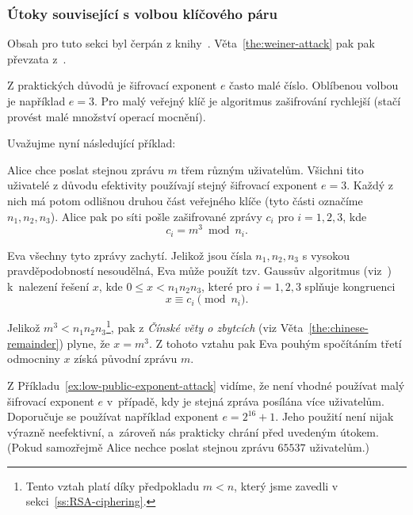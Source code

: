 \documentclass[
  program=infoi,
  biblatex=false,
  figures=true,
  glossaries,
  tables=false,
  sourcecodes=true,
  index
]{kidiplom}
\begin{document}
    \subsubsection{Útoky související s volbou klíčového páru}\label{ss:RSA-exponent-attacks}


        Obsah pro tuto sekci byl čerpán z knihy~\cite{handbook}.
        Věta~\ref{the:weiner-attack} pak pak převzata z~\cite{rsa-and-public}.

        Z praktických důvodů je šifrovací exponent $e$ často malé číslo. Oblíbenou volbou je například $e = 3$.
        Pro malý veřejný klíč je algoritmus zašifrování rychlejší (stačí provést malé množství operací mocnění).

        Uvažujme nyní následující příklad:

        \begin{example}\label{ex:low-public-exponent-attack}
            Alice chce poslat stejnou zprávu $m$ třem různým uživatelům.
            Všichni tito uživatelé z důvodu efektivity používají stejný šifrovací exponent $e = 3$.
            Každý z nich má potom odlišnou druhou část veřejného klíče (tyto části označíme $n_1,n_2,n_3$).
            Alice pak po síti pošle zašifrované zprávy $c_i$ pro $i = 1,2,3$, kde
            \[
                c_i = m^3 \bmod{n_i}.
            \]

            \noindent
            Eva všechny tyto zprávy zachytí.
            Jelikož jsou čísla $n_1,n_2,n_3$ s vysokou pravděpodobností nesoudělná, Eva může použít tzv. Gaussův
            algoritmus (viz~\cite{handbook}) k~nalezení řešení $x$, kde $0 \leq x < n_1n_2n_3$, které pro $i = 1,2,3$ splňuje kongruenci
            \[
                x \equiv c_i \pmod{n_i}.
            \]

            \noindent
            Jelikož $m^3 < n_1n_2n_3$\footnote{Tento vztah platí díky předpokladu $m < n$,
            který jsme zavedli v sekci~\ref{ss:RSA-ciphering}.}, pak z \emph{Čínské věty o zbytcích}
            (viz Věta~\ref{the:chinese-remainder}) plyne, že $x = m^3$.
            Z tohoto vztahu pak Eva pouhým spočítáním třetí odmocniny $x$ získá původní zprávu $m$.
        \end{example}

        

        Z Příkladu~\ref{ex:low-public-exponent-attack} vidíme, že není vhodné používat malý šifrovací exponent $e$ v~případě,
        kdy je stejná zpráva posílána více uživatelům.
        Doporučuje se používat například exponent $e = 2^{16} + 1$.
        Jeho použití není nijak výrazně neefektivní, a~zároveň nás prakticky chrání před uvedeným útokem.
        (Pokud samozřejmě Alice nechce poslat stejnou zprávu $65537$ uživatelům.)
        
\end{document}
